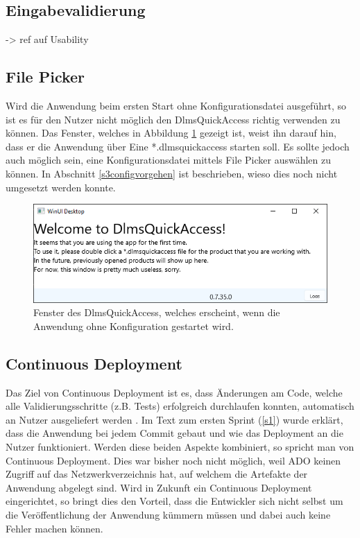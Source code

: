 \subsection{Eingabevalidierung}
-> ref auf Usability

\subsection{File Picker}\label{ausblick:filePicker}
Wird die Anwendung beim ersten Start ohne Konfigurationsdatei ausgeführt, so ist es für den Nutzer nicht möglich den DlmsQuickAccess richtig verwenden zu können.
Das Fenster, welches in Abbildung \ref{fig:welcomeScreenEmpty} gezeigt ist, weist ihn darauf hin, dass er die Anwendung über Eine *.dlmsquickaccess starten soll.
Es sollte jedoch auch möglich sein, eine Konfigurationsdatei mittels File Picker auswählen zu können.
In Abschnitt \ref{s3configvorgehen} ist beschrieben, wieso dies noch nicht umgesetzt werden konnte.

\begin{figure}[H]
   \centering
   \includegraphics[width=1.0\textwidth]{gfx/welcomeScreenEmpty.png}
   \caption{
       Fenster des DlmsQuickAccess, welches erscheint, wenn die Anwendung ohne Konfiguration gestartet wird.
   }
   \label{fig:welcomeScreenEmpty}
\end{figure}

\subsection{Continuous Deployment}
Das Ziel von Continuous Deployment ist es, dass Änderungen am Code, welche alle Validierungsschritte (z.B. Tests) erfolgreich durchlaufen konnten, automatisch an Nutzer ausgeliefert werden \parencite{atlassian_2019}.
Im Text zum ersten Sprint (\ref{s1}) wurde erklärt, dass die Anwendung bei jedem Commit gebaut und wie das Deployment an die Nutzer funktioniert.
Werden diese beiden Aspekte kombiniert, so spricht man von Continuous Deployment.
Dies war bisher noch nicht möglich, weil \ac{ADO} keinen Zugriff auf das Netzwerkverzeichnis hat, auf welchem die Artefakte der Anwendung abgelegt sind.
Wird in Zukunft ein Continuous Deployment eingerichtet, so bringt dies den Vorteil, dass die Entwickler sich nicht selbst um die Veröffentlichung der Anwendung kümmern müssen und dabei auch keine Fehler machen können.

